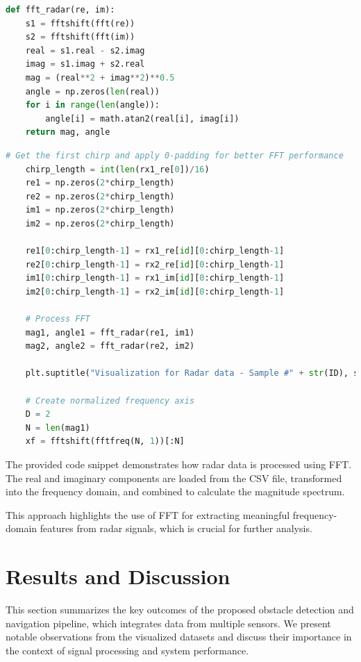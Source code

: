 \documentclass[12pt,a4paper]{article}
\begin{document}
\begin{lstlisting}[language=Python, caption=Radar data is processed with FFT to obtain magnitude and angle values.]
def fft_radar(re, im):
    s1 = fftshift(fft(re))
    s2 = fftshift(fft(im))
    real = s1.real - s2.imag
    imag = s1.imag + s2.real
    mag = (real**2 + imag**2)**0.5
    angle = np.zeros(len(real))
    for i in range(len(angle)):
        angle[i] = math.atan2(real[i], imag[i])
    return mag, angle
\end{lstlisting}
\begin{lstlisting}[language=Python, caption=Normalized Frequency]
    # Get the first chirp and apply 0-padding for better FFT performance
    chirp_length = int(len(rx1_re[0])/16)
    re1 = np.zeros(2*chirp_length)
    re2 = np.zeros(2*chirp_length)
    im1 = np.zeros(2*chirp_length)
    im2 = np.zeros(2*chirp_length)

    re1[0:chirp_length-1] = rx1_re[id][0:chirp_length-1]
    re2[0:chirp_length-1] = rx2_re[id][0:chirp_length-1]
    im1[0:chirp_length-1] = rx1_im[id][0:chirp_length-1]
    im2[0:chirp_length-1] = rx2_im[id][0:chirp_length-1]

    # Process FFT
    mag1, angle1 = fft_radar(re1, im1)
    mag2, angle2 = fft_radar(re2, im2)

    plt.suptitle("Visualization for Radar data - Sample #" + str(ID), size=16)

    # Create normalized frequency axis
    D = 2
    N = len(mag1)
    xf = fftshift(fftfreq(N, 1))[:N]
\end{lstlisting}
The provided code snippet demonstrates how radar data is processed using FFT. The real and imaginary components are loaded from the CSV file, transformed into the frequency domain, and combined to calculate the magnitude spectrum.

This approach highlights the use of FFT for extracting meaningful frequency-domain features from radar signals, which is crucial for further analysis.


\section{Results and Discussion}

This section summarizes the key outcomes of the proposed obstacle detection and navigation pipeline, which integrates data from multiple sensors. We present notable observations from the visualized datasets and discuss their importance in the context of signal processing and system performance.
\end{document}
